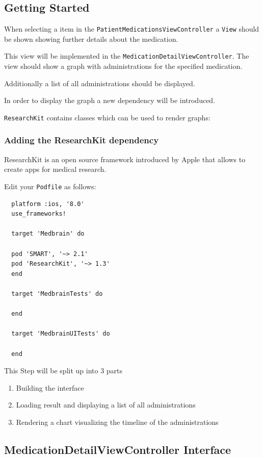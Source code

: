 \documentclass{article}
\begin{document}
\subsection{Getting Started}\label{getting-started}

When selecting a item in the \texttt{PatientMedicationsViewController} a
\texttt{View} should be shown showing further details about the
medication.

This view will be implemented in the
\texttt{MedicationDetailViewController}. The view should show a graph
with administrations for the specified medication.

Additionally a list of all administrations should be displayed.

In order to display the graph a new dependency will be introduced.

\texttt{ResearchKit} contains classes which can be used to render
graphs:

\subsubsection{Adding the ResearchKit dependency}\label{adding-the-researchkit-dependency}
ResearchKit\cite{research-kit} is an open source framework introduced by Apple that allows to create apps for medical research.

Edit your \texttt{Podfile} as follows:

\begin{verbatim}
  platform :ios, '8.0'
  use_frameworks!

  target 'Medbrain' do

  pod 'SMART', '~> 2.1'
  pod 'ResearchKit', '~> 1.3'
  end

  target 'MedbrainTests' do

  end

  target 'MedbrainUITests' do

  end
\end{verbatim}

This Step will be split up into 3 parts
\begin{enumerate}
  \item
    Building the interface
  \item
    Loading result and displaying a list of all administrations
  \item
    Rendering a chart visualizing the timeline of the administrations
\end{enumerate}

\subsection{MedicationDetailViewController Interface}\label{step-7.1---implementing-medicationdetailviewcontroller---medicationdetailviewcontroller-interface}
\end{document}
